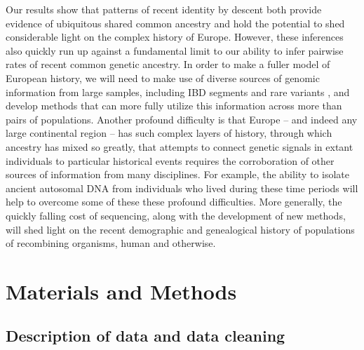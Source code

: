 \documentclass{article}
\begin{document}
Our results show that patterns of recent identity by descent both
provide evidence of ubiquitous shared common ancestry and hold the 
potential to shed considerable light on the complex history of Europe.
However, these inferences also quickly run up against a fundamental limit 
to our ability to infer pairwise rates of recent common genetic ancestry.
In order to make a fuller model of European history, we will need to
make use of diverse sources of genomic information from large samples, 
including IBD segments and rare variants \citep{nelson2012abundance,tennessen2012evolution},
and develop methods that can more fully utilize this information across more than pairs of populations.
Another profound difficulty is that Europe -- 
and indeed any large continental region -- 
has such complex layers of history, 
through which ancestry has mixed so greatly,
that attempts to connect genetic signals in extant individuals 
to particular historical events 
requires the corroboration of other sources of information from many disciplines.
For example, the ability to isolate ancient autosomal DNA from individuals who lived during these time periods 
\citep[as do][]{skoglund2012origins,keller2012insights}
will help to overcome some of these these profound difficulties.
More generally, the quickly falling cost of sequencing, along with the development of new methods, 
will shed light on the recent demographic and genealogical history of populations of recombining organisms, 
human and otherwise.



\section{Materials and Methods}
\label{ss:methods}

\subsection*{Description of data and data cleaning}
\label{ss:thedata}
\end{document}
